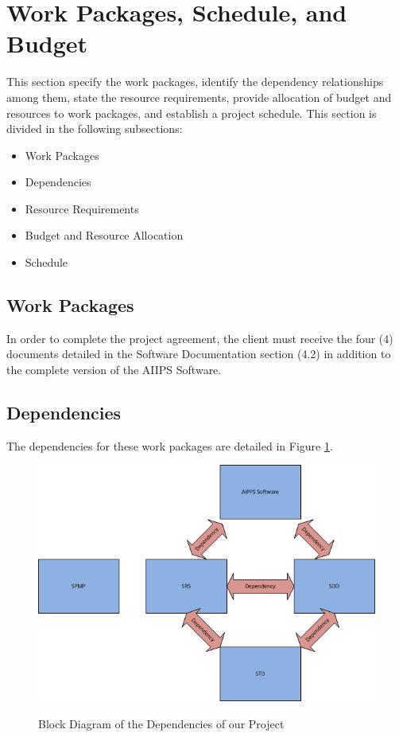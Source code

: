 \documentclass[12pt]{article}
\begin{document}
\section{Work Packages, Schedule, and Budget}
This section specify the work packages, identify the dependency relationships among them, state the resource requirements, provide allocation of budget and resources to work packages, and establish a project schedule. This section is divided in the following subsections:
\begin{itemize}
  \item Work Packages
  \item Dependencies
  \item Resource Requirements
  \item Budget and Resource Allocation
  \item Schedule
\end{itemize}

\subsection{Work Packages}
In order to complete the project agreement, the client must receive the four (4) documents detailed in the Software Documentation section (4.2) in addition to the complete version of the AIIPS Software.

\subsection{Dependencies}
The dependencies for these work packages are detailed in Figure \ref{dependencies}.

\begin{figure}[H]\centering
  \includegraphics[width=6.0in]{dependencies}\\
  \caption{Block Diagram of the Dependencies of our Project}\label{dependencies}
  \end{figure}
\end{document}
